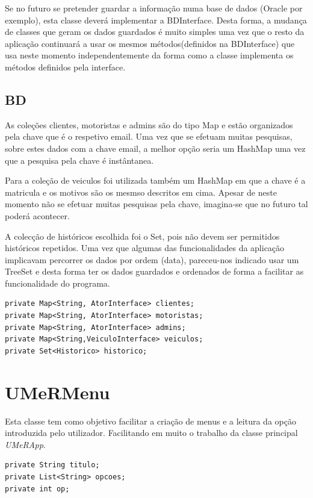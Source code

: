 Se no futuro se pretender guardar a informação numa base de dados (Oracle por exemplo), esta classe deverá implementar a BDInterface. Desta forma, a mudança de classes que geram os dados guardados é muito simples uma vez que o resto da aplicação continuará a usar os mesmos métodos(definidos na BDInterface) que usa neste momento independentemente da forma como a classe implementa os métodos definidos pela interface. 

\subsection{BD}

As coleções clientes, motoristas e admins são do tipo Map e estão organizados pela chave que é o respetivo email. Uma vez que se efetuam muitas pesquisas, sobre estes dados com a chave email, a melhor opção seria um HashMap uma vez que a pesquisa pela chave é instântanea. 

Para a coleção de veiculos foi utilizada também um HashMap em que a chave é a matricula e os motivos são os mesmso descritos em cima.  Apesar de neste momento não se efetuar muitas pesquisas pela chave, imagina-se que no futuro tal poderá acontecer. 

A colecção de históricos escolhida foi o Set, pois não devem ser permitidos históricos repetidos. Uma vez que algumas das funcionalidades da aplicação implicavam percorrer os dados por ordem (data), pareceu-nos indicado usar um TreeSet e desta forma ter os dados guardados e ordenados de forma a facilitar as funcionalidade do programa.  

\begin{verbatim}
private Map<String, AtorInterface> clientes;
private Map<String, AtorInterface> motoristas; 
private Map<String, AtorInterface> admins; 
private Map<String,VeiculoInterface> veiculos; 
private Set<Historico> historico;
\end{verbatim}

\section{UMeRMenu}

Esta classe tem como objetivo facilitar a criação de menus e a leitura da opção introduzida pelo utilizador. 
Facilitando em muito o trabalho da classe principal \textit{UMeRApp}. 
\begin{verbatim}
private String titulo;
private List<String> opcoes;
private int op;
\end{verbatim}

